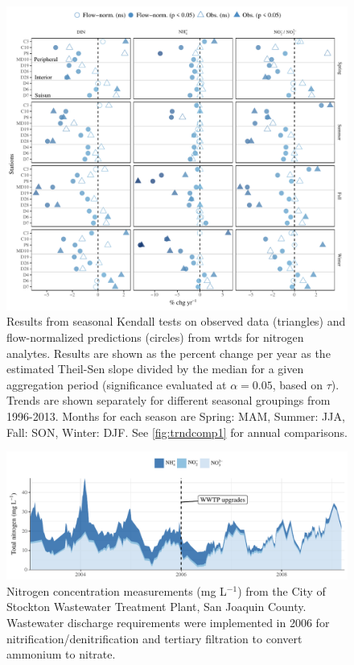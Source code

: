 \documentclass[letterpaper,12pt,oneside]{article}\usepackage[]{graphicx}\usepackage[]{color}
\begin{document}
\begin{figure}
\centering
\includegraphics[width=1\textwidth,page=1]{figs/trndcomp3.pdf}
\caption{Results from seasonal Kendall tests on observed data (triangles) and flow-normalized predictions (circles) from \ac{wrtds} for nitrogen analytes. Results are shown as the percent change per year as the estimated Theil-Sen slope divided by the median for a given aggregation period (significance evaluated at $\alpha = 0.05$, based on $\tau$). Trends are shown separately for different seasonal groupings from 1996-2013. Months for each season are Spring: MAM, Summer: JJA, Fall: SON, Winter: DJF. See \cref{fig:trndcomp1} for annual comparisons.}
\label{fig:trndcomp3}   
\end{figure}

\begin{figure}[!ht]

{\centering \includegraphics[width=\textwidth]{figs/stock-1} 

}

\caption[Nitrogen concentration measurements (mg L$^{-1}$) from the City of Stockton Wastewater Treatment Plant, San Joaquin County]{Nitrogen concentration measurements (mg L$^{-1}$) from the City of Stockton Wastewater Treatment Plant, San Joaquin County.  Wastewater discharge requirements were implemented in 2006 for nitrification/denitrification and tertiary filtration to convert ammonium to nitrate.}\label{fig:stock}
\end{figure}
\end{document}
